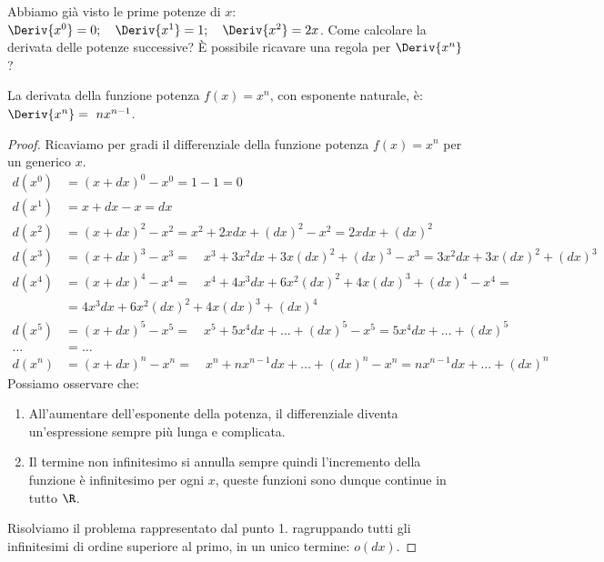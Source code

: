 Abbiamo già visto le prime potenze di \(x\): 
\(\Deriv{x^0} = 0; \quad \Deriv{x^1} = 1; \quad \Deriv{x^2} = 2x\).
Come calcolare la derivata delle potenze successive? 
È possibile ricavare una regola per \(\Deriv{x^n}\)?

\begin{teorema}
\label{diff01_teoderpotenza}
La derivata della funzione potenza \(f(x)= x^n\), con esponente 
naturale, è: \(\Deriv{x^n}=~nx^{n-1}\).
\end{teorema}

\begin{proof}
Ricaviamo per gradi il differenziale della funzione potenza \(f(x)=x^n\)
per un generico \(x\).
\begin{align*}
  d(x^0) &=(x+dx)^0-x^0 = 1 -1 = 0\\
  d(x^1) &=x+dx-x =dx\\
  d(x^2) &=(x+dx)^2-x^2 = x^2 +2xdx +(dx)^2 -x^2 = 2xdx +(dx)^2\\
  d(x^3) &=(x+dx)^3-x^3 = \quad{x^3+3x^2dx+3x(dx)^2+(dx)^3}-x^3=
                      3x^2dx+3x(dx)^2+(dx)^3\\
  d(x^4) &=(x+dx)^4-x^4 = 
           \quad{x^4+4x^3dx+6x^2(dx)^2+4x(dx)^3+(dx)^4}-x^4=\\
         &=4x^3dx+6x^2(dx)^2+4x(dx)^3+(dx)^4  \\
  d(x^5) &= (x+dx)^5-x^5 = \quad{x^5+5x^4dx+\dots +(dx)^5}-x^5=
         5x^4dx+\dots+(dx)^5\\
  \dots  &= \dots\\
  d(x^n) &= (x+dx)^n-x^n = \quad{x^n+nx^{n-1}dx+\dots +(dx)^n}-x^n=
         nx^{n-1}dx+\dots+(dx)^n
\end{align*}
Possiamo osservare che:
\begin{enumerate}
\item 
All'aumentare dell'esponente della potenza, il 
differenziale diventa un'espressione sempre più lunga e complicata.
\item 
Il termine non infinitesimo si annulla sempre quindi l'incremento della 
funzione è infinitesimo per ogni \(x\), queste funzioni 
sono dunque continue in tutto \(\R\).
\end{enumerate}
Risolviamo il problema rappresentato dal punto 1. ragruppando tutti gli 
infinitesimi di ordine superiore al primo, in un unico termine: \(o(dx)\).


\end{proof}
